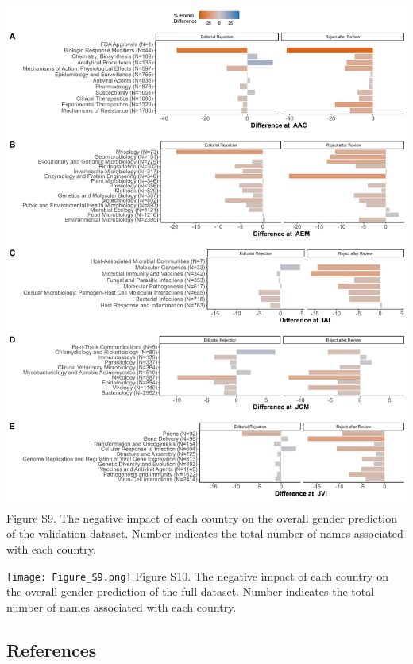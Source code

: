 \documentclass[11pt,]{article}
\begin{document}
\includegraphics{Figure_S8.png} Figure S9. The negative impact of each
country on the overall gender prediction of the validation dataset.
Number indicates the total number of names associated with each country.

\newpage

\texttt{[image: Figure\_S9.png]} Figure S10. The negative impact of each
country on the overall gender prediction of the full dataset. Number
indicates the total number of names associated with each country.

\subsection{References}\label{references}
\end{document}
